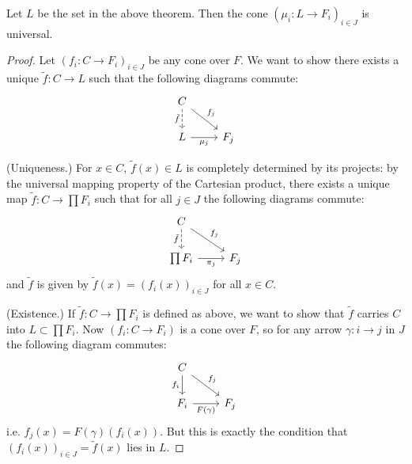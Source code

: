 \documentclass[12pt]{article}
\begin{document}
\begin{lemma}
	Let $L$ be the set in the above theorem. Then the cone $(\mu_i: L\to F_i)_{i\in J}$ is universal.
\end{lemma}
\begin{proof}
	Let $(f_i:C\to F_i)_{i\in J}$ be any cone over $F$. We want to show there exists a unique $\tilde{f}:C\to L$ such that the following diagrams commute:
	\begin{equation*}
\begin{tikzcd}
C \arrow[d, "\tilde{f}"', dashed] \arrow[rd, "f_j"] &     \\
L \arrow[r, "\mu_j"']                               & F_j
\end{tikzcd}
	\end{equation*}

	(Uniqueness.) For $x\in C$, $\tilde{f}(x)\in L$ is completely determined by its projects: by the universal mapping property of the Cartesian product, there exists a unique map $\tilde{f}:C\to \prod F_i$ such that for all $j\in J$ the following diagrams commute:
	\begin{equation*}
\begin{tikzcd}
C \arrow[d, "\tilde{f}"', dashed] \arrow[rd, "f_j"] &     \\
\prod F_i \arrow[r, "\pi_j"']                       & F_j
\end{tikzcd}
	\end{equation*}
	and $\tilde{f}$ is given by $\tilde{f}(x)=(f_i(x))_{i\in J}$ for all $x\in C$.

	(Existence.) If $\tilde{f}:C\to \prod F_i$ is defined as above, we want to show that $\tilde{f}$ carries $C$ into $L\subset\prod F_i$. Now $(f_i: C\to F_i)$ is a cone over $F$, so for any arrow $\gamma:i\to j$ in $J$ the following diagram commutes:
	\begin{equation*}
\begin{tikzcd}
C \arrow[d, "f_i"'] \arrow[rd, "f_j"] &     \\
F_i \arrow[r, "F(\gamma)"']           & F_j
\end{tikzcd}
	\end{equation*}
	i.e. $f_j(x)=F(\gamma)(f_i(x))$. But this is exactly the condition that $(f_i(x))_{i\in J}=\tilde{f}(x)$ lies in $L$.
\end{proof}
\end{document}

